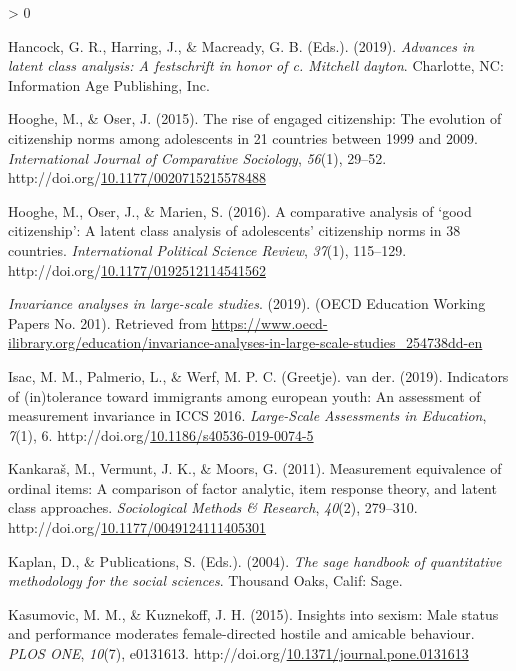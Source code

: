 \documentclass[12pt,twoside]{reedthesis}
\newlength{\cslhangindent}
\newenvironment{CSLReferences}[2] %
 {%
  \setlength{\parindent}{0pt}
  \ifodd #1 \everypar{\setlength{\hangindent}{\cslhangindent}}\ignorespaces\fi
  \ifnum #2 > 0
  \setlength{\parskip}{#2\baselineskip}
  \fi
 }%
 {}
\begin{document}
\begin{CSLReferences}{1}{0}
\leavevmode\hypertarget{ref-hancock_advances_2019}{}%
Hancock, G. R., Harring, J., \& Macready, G. B. (Eds.). (2019). \emph{Advances in latent class analysis: A festschrift in honor of c. Mitchell dayton}. Charlotte, {NC}: Information Age Publishing, Inc.

\leavevmode\hypertarget{ref-hooghe_rise_2015}{}%
Hooghe, M., \& Oser, J. (2015). The rise of engaged citizenship: The evolution of citizenship norms among adolescents in 21 countries between 1999 and 2009. \emph{International Journal of Comparative Sociology}, \emph{56}(1), 29--52. http://doi.org/\href{https://doi.org/10.1177/0020715215578488}{10.1177/0020715215578488}

\leavevmode\hypertarget{ref-hooghe_comparative_2016}{}%
Hooghe, M., Oser, J., \& Marien, S. (2016). A comparative analysis of {`good citizenship'}: A latent class analysis of adolescents' citizenship norms in 38 countries. \emph{International Political Science Review}, \emph{37}(1), 115--129. http://doi.org/\href{https://doi.org/10.1177/0192512114541562}{10.1177/0192512114541562}

\leavevmode\hypertarget{ref-noauthor_invariance_2019}{}%
\emph{Invariance analyses in large-scale studies}. (2019). (OECD Education Working Papers No. 201). Retrieved from \url{https://www.oecd-ilibrary.org/education/invariance-analyses-in-large-scale-studies_254738dd-en}

\leavevmode\hypertarget{ref-isac_indicators_2019}{}%
Isac, M. M., Palmerio, L., \& Werf, M. P. C. (Greetje). van der. (2019). Indicators of (in)tolerance toward immigrants among european youth: An assessment of measurement invariance in {ICCS} 2016. \emph{Large-Scale Assessments in Education}, \emph{7}(1), 6. http://doi.org/\href{https://doi.org/10.1186/s40536-019-0074-5}{10.1186/s40536-019-0074-5}

\leavevmode\hypertarget{ref-kankaras_measurement_2011}{}%
Kankaraš, M., Vermunt, J. K., \& Moors, G. (2011). Measurement equivalence of ordinal items: A comparison of factor analytic, item response theory, and latent class approaches. \emph{Sociological Methods \& Research}, \emph{40}(2), 279--310. http://doi.org/\href{https://doi.org/10.1177/0049124111405301}{10.1177/0049124111405301}

\leavevmode\hypertarget{ref-kaplan_sage_2004}{}%
Kaplan, D., \& Publications, S. (Eds.). (2004). \emph{The sage handbook of quantitative methodology for the social sciences}. Thousand Oaks, Calif: Sage.

\leavevmode\hypertarget{ref-kasumovic_insights_2015}{}%
Kasumovic, M. M., \& Kuznekoff, J. H. (2015). Insights into sexism: Male status and performance moderates female-directed hostile and amicable behaviour. \emph{{PLOS} {ONE}}, \emph{10}(7), e0131613. http://doi.org/\href{https://doi.org/10.1371/journal.pone.0131613}{10.1371/journal.pone.0131613}


\end{CSLReferences}
\end{document}
